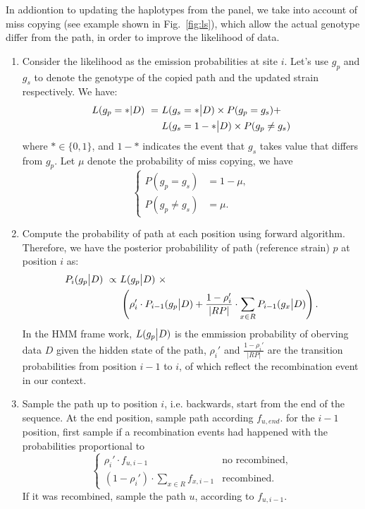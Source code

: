 \documentclass{bioinfo}
\begin{document}
\begin{methods}
In addiontion to updating the haplotypes from the panel, we take into account of miss copying (see example shown in Fig.~\ref{fig:ls}), which allow the actual genotype differ from the path, in order to improve the likelihood of data.

\begin{enumerate}
\item Consider the likelihood as the emission probabilities at site $i$. Let's use $g_p$ and $g_s$ to denote the genotype of the copied path and the updated strain respectively. We have:
\begin{equation}
\begin{split}
L(g_p = * | D) ~ = ~ & L(g_s = * \big{|} D) \times P(g_p = g_s) + \\
                     & L(g_s = 1 - * \big{|} D) \times P(g_p \neq g_s) \label{eqn:gp_given_D}
\end{split}
\end{equation}
where $*\in \{0,1\}$, and $1-*$ indicates the event that $g_s$ takes value that differs from $g_p$. Let $\mu$ denote the probability of miss copying, we have
$$\begin{cases}
P(g_p = g_s) &= 1-\mu, \\
P(g_p \neq g_s) &= \mu .\end{cases}$$

\item Compute the probability of path at each position using forward algorithm. Therefore, we have the posterior probabilility of path (reference strain) $p$ at position $i$ as:
\begin{equation}
\begin{split}
P_i(g_p \big{|} D) ~ \propto ~ & L(g_p \big{|} D) ~ \times \\
                               & \left( \rho_i' \cdot P_{i-1}(g_p \big{|} D)  +  \frac{1-\rho_i'}{|RP|} \cdot \sum_{x\in R} P_{i-1} (g_x \big{|} D) \right).
\end{split}\label{eqn:post_path}
\end{equation}
In the HMM frame work, $L(g_p \big{|} D)$ is the emmission probability of oberving data $D$ given the hidden state of the path, $\rho_i'$ and $\frac{1-\rho_i'}{|RP|}$ are the transition probabilities from position $i-1$ to $i$, of which reflect the recombination event in our context.

\item Sample the path up to position $i$, i.e. backwards, start from the end of the sequence. At the end position, sample path according $f_{u,end}$.
for the $i-1$ position, first sample if a recombination events had happened with the probabilities proportional to
$$
\begin{cases}
\rho_i' \cdot f_{u,i-1} & \text{no recombined},\\
\displaystyle ( 1-\rho_i' ) \cdot \sum_{x\in R} f_{x,i-1} & \text{recombined}.
\end{cases}
$$
If it was recombined, sample the path $u$, according to $f_{u,i-1}$.


\end{enumerate}
\end{methods}
\end{document}
